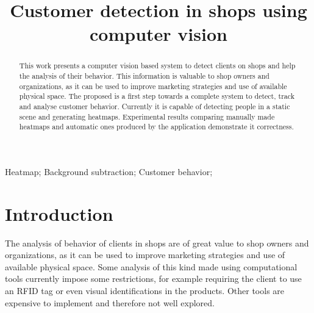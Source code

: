 \documentclass[10pt, conference]{IEEEtran}
\begin{document}
	
	\title{Customer detection in shops using computer vision}
	
	\newif\iffinal
	\finaltrue
	\newcommand{\jemsid}{99999}
	\author{%
		\and
	}
	
	\maketitle
	
	\begin{abstract}
		This work presents a computer vision based system to detect clients on shops and help the analysis of their behavior. This information is valuable to shop owners and organizations, as it can be used to improve marketing strategies and use of available physical space. The proposed is a first step towards a complete system to detect, track and analyse customer behavior. Currently it is capable of detecting people in a static scene and generating heatmaps. Experimental results comparing manually made heatmaps and automatic ones produced by the application demonstrate it correctness.
	\end{abstract}
	
	\begin{IEEEkeywords}
		Heatmap; Background subtraction; Customer behavior;
		
	\end{IEEEkeywords}
	
	\IEEEpeerreviewmaketitle
	
	\section{Introduction}
	The analysis of behavior of clients in shops are of great value to shop owners and organizations, as it can be used to improve marketing strategies and use of available physical space. Some analysis of this kind made using computational tools currently impose some restrictions, for example requiring the client to use an RFID tag or even visual identifications in the products. Other tools are expensive to implement and therefore not well explored.
	
\end{document}

